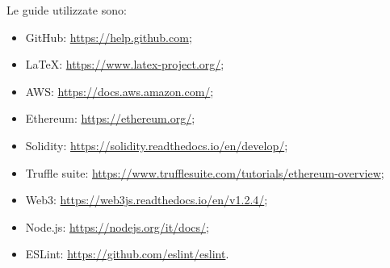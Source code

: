    			Le guide utilizzate sono:
   			\begin{itemize}
   				\item GitHub: \href{https://help.github.com}{https://help.github.com};
   				\item \LaTeX: \href{https://www.latex-project.org/}{https://www.latex-project.org/};
   				\item  AWS: \href{https://docs.aws.amazon.com/}{https://docs.aws.amazon.com/};
   				\item Ethereum\glos: \href{https://ethereum.org/}{https://ethereum.org/};
   				\item Solidity: \href{https://solidity.readthedocs.io/en/develop/}{https://solidity.readthedocs.io/en/develop/};
   				\item Truffle suite: \href{https://www.trufflesuite.com/tutorials/ethereum-overview}{https://www.trufflesuite.com/tutorials/ethereum-overview};
   				\item Web3: \href{https://web3js.readthedocs.io/en/v1.2.4/}{https://web3js.readthedocs.io/en/v1.2.4/};
   				\item Node.js: \href{https://nodejs.org/it/docs/}{https://nodejs.org/it/docs/};
   				\item ESLint: \href{https://github.com/eslint/eslint}{https://github.com/eslint/eslint}.
   			\end{itemize}
